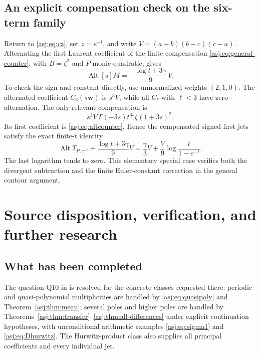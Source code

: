 \documentclass[11pt]{article}
\numberwithin{equation}{section}
\theoremstyle{definition}\newtheorem{definition}[theorem]{Definition}
\theoremstyle{remark}\newtheorem{remark}[theorem]{Remark}\newtheorem{example}[theorem]{Example}
\begin{document}
\subsection{An explicit compensation check on the six-term family}
Return to \eqref{asj:eq:cz}, set $z=e^{-t}$, and write
$V=(a-b)(b-c)(c-a)$. Alternating the first Laurent coefficient of the
finite compensation \eqref{asj:eq:general-counter}, with $B=\zeta^2$ and
$P$ monic quadratic, gives
\begin{equation}\label{asj:eq:altcounter}
 \operatorname{Alt}[s]M=-\frac{\log t+3\gamma}{9}\,V.
\end{equation}
To check the sign and constant directly, use unnormalized weights
$(2,1,0)$. The alternated coefficient $C_3(s\boldsymbol w)$ is
$s^3V$, while all $C_\ell$ with $\ell<3$ have zero alternation.
The only relevant compensation is
\[
 s^3V\,\Gamma(-3s)t^{3s}\zeta(1+3s)^2.
\]
Its first coefficient is \eqref{asj:eq:altcounter}. Hence the compensated
signed first jets satisfy the exact finite-$t$ identity
\begin{equation}\label{asj:eq:altfinite}
 \operatorname{Alt}T_{P,e^{-t}}+\frac{\log t+3\gamma}{9}V
  =\frac\gamma3V+\frac{V}{9}\log\frac{t}{1-e^{-t}}.
\end{equation}
The last logarithm tends to zero. This elementary special case verifies
both the divergent subtraction and the finite Euler-constant correction
in the general contour argument.



\section{Source disposition, verification, and further research}
\label{asj:sec:audit}

\subsection{What has been completed}
The question Q10 in \cite{prior} is resolved for the concrete classes
requested there: periodic and quasi-polynomial multiplicities are
handled by \eqref{asj:eq:quasipoly} and Theorem~\ref{asj:thm:mean}; several
poles and higher poles are handled by Theorems~\ref{asj:thm:transfer}--\ref{asj:thm:all-differences}
under explicit continuation hypotheses, with unconditional arithmetic
examples \eqref{asj:eq:sigma1} and \eqref{asj:eq:Dhurwitz}. The Hurwitz-product
class also supplies all principal coefficients and every individual jet.
\end{document}
